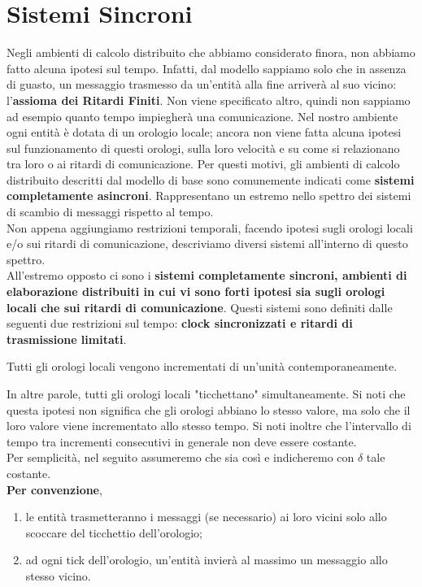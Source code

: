 \chapter{Sistemi Sincroni}

Negli ambienti di calcolo distribuito che abbiamo considerato finora, non
abbiamo fatto alcuna ipotesi sul tempo. Infatti, dal modello sappiamo solo che
in assenza di guasto, un messaggio trasmesso da un'entità alla fine arriverà al
suo vicino: l'\textbf{assioma dei Ritardi Finiti}. Non viene specificato altro,
quindi non sappiamo ad esempio quanto tempo impiegherà una comunicazione. Nel
nostro ambiente ogni entità è dotata di un orologio locale; ancora non viene
fatta alcuna ipotesi sul funzionamento di questi orologi, sulla loro velocità e
su come si relazionano tra loro o ai ritardi di comunicazione. Per questi
motivi, gli ambienti di calcolo distribuito descritti dal modello di base sono
comunemente indicati come \textbf{sistemi completamente asincroni}.
Rappresentano un estremo nello spettro dei sistemi di scambio di messaggi
rispetto al tempo.\\
Non appena aggiungiamo restrizioni temporali, facendo ipotesi sugli orologi
locali e/o sui ritardi di comunicazione, descriviamo diversi sistemi all'interno
di questo spettro.\\
All'estremo opposto ci sono i \textbf{sistemi completamente sincroni, ambienti
    di elaborazione distribuiti in cui vi sono forti ipotesi sia sugli orologi
    locali che sui ritardi di comunicazione}. Questi sistemi sono definiti dalle
seguenti due restrizioni sul tempo: \textbf{clock sincronizzati e ritardi di
    trasmissione limitati}.\\

\begin{limit}
    Tutti gli orologi locali
    vengono incrementati di un'unità contemporaneamente.
\end{limit}

In altre parole, tutti gli orologi locali "ticchettano" simultaneamente. Si noti
che questa ipotesi non significa che gli orologi abbiano lo stesso valore, ma
solo che il loro valore viene incrementato allo stesso tempo. Si noti inoltre
che l'intervallo di tempo tra incrementi consecutivi in generale non deve essere
costante.\\
Per semplicità, nel seguito assumeremo che sia così e indicheremo con $\delta$
tale costante.\\

\textbf{Per convenzione},
\begin{enumerate}
    \item le entità trasmetteranno i messaggi (se necessario) ai loro vicini solo
          allo scoccare del ticchettio dell'orologio;
    \item ad ogni tick dell'orologio, un'entità invierà al massimo un messaggio allo stesso vicino.
\end{enumerate}

